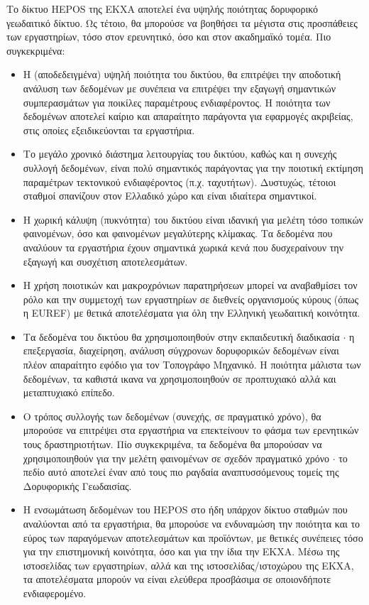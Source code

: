 \documentclass[11pt]{article}
\begin{document}
\vspace{0.5cm}
Το δίκτυο HEPOS της ΕΚΧΑ αποτελεί ένα υψηλής ποιότητας δορυφορικό γεωδαιτικό δίκτυο. Ως τέτοιο, θα μπορούσε να βοηθήσει τα μέγιστα στις προσπάθειες των εργαστηρίων, τόσο στον ερευνητικό, όσο και στον ακαδημαϊκό τομέα. Πιο συγκεκριμένα:
\begin{itemize}
\item Η (αποδεδειγμένα) υψηλή ποιότητα του δικτύου, θα επιτρέψει την αποδοτική ανάλυση των δεδομένων με συνέπεια να επιτρέψει την εξαγωγή σημαντικών συμπερασμάτων για ποικίλες παραμέτρους ενδιαφέροντος. Η ποιότητα των δεδομένων αποτελεί καίριο και απαραίτητο παράγοντα για εφαρμογές ακριβείας, στις οποίες εξειδικεύονται τα εργαστήρια.
\item Το μεγάλο χρονικό διάστημα λειτουργίας του δικτύου, καθώς και η συνεχής συλλογή δεδομένων, είναι πολύ σημαντικός παράγοντας για την ποιοτική εκτίμηση παραμέτρων τεκτονικού ενδιαφέροντος (π.χ. ταχυτήτων). Δυστυχώς, τέτοιοι σταθμοί σπανίζουν στον Ελλαδικό χώρο και είναι ιδιαίτερα σημαντικοί.
\item Η χωρική κάλυψη (πυκνότητα) του δικτύου είναι ιδανική για μελέτη τόσο τοπικών φαινομένων, όσο και φαινομένων μεγαλύτερης κλίμακας. Τα δεδομένα που αναλύουν τα εργαστήρια έχουν σημαντικά χωρικά κενά που δυσχεραίνουν την εξαγωγή και συσχέτιση αποτελεσμάτων.
\item Η χρήση ποιοτικών και μακροχρόνιων παρατηρήσεων μπορεί να αναβαθμίσει τον ρόλο και την συμμετοχή των εργαστηρίων σε διεθνείς οργανισμούς κύρους (όπως η EUREF) με θετικά αποτελέσματα για όλη την Ελληνική γεωδαιτική κοινότητα.
\item Τα δεδομένα του δικτύου θα χρησιμοποιηθούν στην εκπαιδευτική διαδικασία $\cdot$ η επεξεργασία, διαχείρηση, ανάλυση σύγχρονων δορυφορικών δεδομένων είναι πλέον απαραίτητο εφόδιο για τον Τοπογράφο Μηχανικό. Η ποιότητα μάλιστα των δεδομένων, τα καθιστά ικανα να χρησιμοποιηθούν σε προπτυχιακό αλλά και μεταπτυχιακό επίπεδο.
\item Ο τρόπος συλλογής των δεδομένων (συνεχής, σε πραγματικό χρόνο), θα μπορούσε να επιτρέψει στα εργαστήρια να επεκτείνουν το φάσμα των ερενητικών τους δραστηριοτήτων. Πίο συγκεκριμένα, τα δεδομένα θα μπορούσαν να χρησιμοποιηθούν για την μελέτη φαινομένων σε σχεδόν πραγματικό χρόνο $\cdot$ το πεδίο αυτό αποτελεί έναν από τους πιο ραγδαία αναπτυσσόμενους τομείς της Δορυφορικής Γεωδαισίας.
\item Η ενσωμάτωση δεδομένων του HEPOS στο ήδη υπάρχον δίκτυο σταθμών που αναλύονται από τα εργαστήρια, θα μπορούσε να ενδυναμώση την ποιότητα και το εύρος των παραγόμενων αποτελεσμάτων και προϊόντων, με θετικές συνέπειες τόσο για την επιστημονική κοινότητα, όσο και για την ίδια την ΕΚΧΑ. Μέσω της ιστοσελίδας των εργαστηρίων, αλλά και της ιστοσελίδας/ιστοχώρου της ΕΚΧΑ, τα αποτελέσματα μπορούν να είναι ελεύθερα προσβάσιμα σε οποιονδήποτε ενδιαφερομένο.
\end{itemize}
\end{document}
